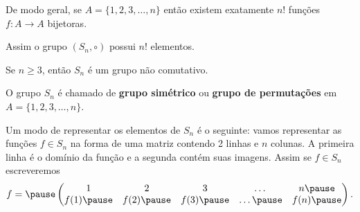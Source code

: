\documentclass{beamer}
\begin{document}
    \begin{frame}
        De modo geral, \pause se $A = \{1, 2, 3, \dots, n\}$ \pause então existem exatamente $n!$ \pause funções $f : A \to A$ bijetoras. \pause

        \vspace{.3cm}

        Assim o grupo $(S_n, \circ)$ \pause possui $n!$ elementos.\pause

        \vspace{.3cm}

        Se $n \geqslant 3$, então \pause $S_n$ é um grupo não comutativo.\pause

        \begin{definicao}
            O grupo $S_n$ é chamado de \pause \textbf{grupo simétrico} \pause ou \textbf{grupo de permutações} \pause em $A = \{1, 2, 3, \dots, n\}$.
        \end{definicao}
    \end{frame}

    \begin{frame}
        Um modo de representar os elementos de $S_n$ é o seguinte: \pause vamos representar as funções $f \in S_n$ \pause na forma de uma matriz contendo 2 linhas \pause e $n$ colunas. \pause A primeira linha é o domínio da função \pause e a segunda contém suas imagens. \pause Assim se $f \in S_n$ escreveremos\pause
        \[
        f = \pause \begin{pmatrix}
            1 & 2 & 3 & \dots & n\pause \\
            f(1) \pause & f(2) \pause & f(3) \pause & \dots \pause & f(n)\pause
        \end{pmatrix}.
        \]
    \end{frame}
\end{document}
